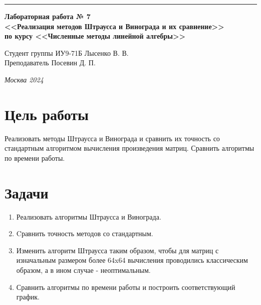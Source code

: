 \documentclass[a4paper, 14pt]{extarticle}
\begin{document}
\begin{titlepage}
\vspace*{-16pt}
\hspace{30pt}\rule{0.866\textwidth}{0.4pt}
  
\vspace{11em}

\begin{center}
\Large {\bf Лабораторная работа № 7} \\ 
\large {\bf<<Реализация методов Штраусса и Винограда и  их сравнение>>} \\ 
\large {\bf по курсу <<Численные методы линейной алгебры>>} \\ 
\end{center}\normalsize

\vspace{8em}


\begin{flushright}
  {Студент группы ИУ9-71Б Лысенко В. В.\hspace*{15pt} \\
  \vspace{2ex}
  Преподаватель Посевин Д. П.\hspace*{15pt}}
\end{flushright}

\bigskip

\vfill
 

\begin{center}
\textsl{Москва 2024}
\end{center}
\end{titlepage}

\renewcommand{\ttdefault}{pcr}

\setlength{\tabcolsep}{3pt}
\newpage
\setcounter{page}{2}

\section{Цель работы}\label{Sect::task}
\par
\renewcommand{\labelenumii}{\arabic{enumi}.\arabic{enumii}.}
Реализовать методы Штраусса и Винограда и сравнить их точность со стандартным алгоритмом вычисления произведения матриц. Сравнить алгоритмы по времени работы.

\section{Задачи}\label{Sect::task}
\par
\renewcommand{\labelenumii}{\arabic{enumi}.\arabic{enumii}.}
\begin{enumerate} 
    \item Реализовать алгоритмы Штраусса и Винограда.
    \item Cравнить точность методов со стандартным.
    \item Изменить алгоритм Штраусса таким образом, чтобы для матриц с изначальным размером более 64x64 вычисления проводились классическим образом, а в ином случае - неоптимальным.
    \item Сравнить алгоритмы по времени работы и построить соответствующий график.
\end{enumerate}
\end{document}
